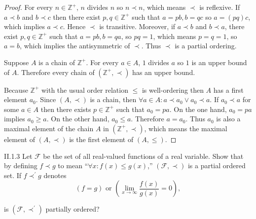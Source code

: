 \begin{proof}
	For every \( n \in \mathbb{Z}^{+} \), \( n \) divides \( n \) so \( n \prec n \), which means \( \prec \) is reflexive. If \( a \prec b \) and \( b \prec c \) then there exist \( p, q \in \mathbb{Z}^{+} \) such that \( a = pb, b = qc \) so \( a = (pq)c \), which implies \( a \prec c \). Hence \( \prec \) is transitive. Moreover, if \( a \prec b \) and \( b \prec a \), there exist \( p, q \in \mathbb{Z}^{+} \) such that \( a = pb, b = qa \), so \( pq = 1 \), which means \( p = q = 1 \), so \( a = b \), which implies the antisymmetric of \( \prec \). Thus \( \prec \) is a partial ordering.

	Suppose \( A \) is a chain of \( \mathbb{Z}^{+} \). For every \( a \in A \), \( 1 \) divides \( a \) so \( 1 \) is an upper bound of \( A \). Therefore every chain of \( (\mathbb{Z}^{+}, \prec) \) has an upper bound.

	Because \( \mathbb{Z}^{+} \) with the usual order relation \( \le \) is well-ordering then \( A \) has a first element \( a_{0} \). Since \( (A, \prec) \) is a chain, then \( \forall a \in A: a \prec a_{0} \lor a_{0} \prec a \). If \( a_{0} \prec a \) for some \( a \in A \) then there exists \( p \in \mathbb{Z}^{+} \) such that \( a_{0} = pa \). On the one hand, \( a_{0} = pa \) implies \( a_{0} \ge a \). On the other hand, \( a_{0} \leq a \). Therefore \( a = a_{0} \). Thus \( a_{0} \) is also a maximal element of the chain \( A \) in \( (\mathbb{Z}^{+}, \prec) \), which means the maximal element of \( (A, \prec) \) is the first element of \( (A, \le) \).
\end{proof}

\begin{problem}{II.1.3}
Let \( \mathscr{F} \) be the set of all real-valued functions of a real variable. Show that by defining \( f \prec g \) to mean ``\( \forall x: f(x) \leq g(x) \),\@'' \( (\mathscr{F}, \prec) \) is a partial ordered set. If \( f \prec^{\prime} g \) denotes
\[
	(f = g) \text{ or } \left(\lim\limits_{x\to\infty} \dfrac{f(x)}{g(x)} = 0\right),
\]

is \( (\mathscr{F}, \prec^{\prime}) \) partially ordered?
\end{problem}

